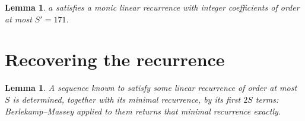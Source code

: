 \documentclass[11pt,a4paper]{article}
\theoremstyle{plain}
\newtheorem{lemma}[theorem]{Lemma}
\theoremstyle{definition}
\begin{document}
\begin{lemma}\label{lem:cf}
$a$ satisfies a monic linear recurrence with integer coefficients of order at most
$S'=171$.
\end{lemma}

\section{Recovering the recurrence}

\begin{lemma}\label{lem:bm}
A sequence known to satisfy some linear recurrence of order at most $S$ is determined, together
with its minimal recurrence, by its first $2S$ terms: Berlekamp--Massey applied to them returns
that minimal recurrence exactly.
\end{lemma}
\end{document}
